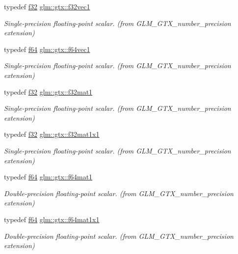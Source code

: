 \begin{DoxyCompactItemize}
typedef \mbox{\hyperlink{group__gtc__type__precision_ga0ec999b57f5330d9021256e96038df04}{f32}} \mbox{\hyperlink{group__gtx__number__precision_gadab8e598b0b4697629482682bdb7f223}{glm\+::gtx\+::f32vec1}}
\begin{DoxyCompactList}\small\item\em Single-\/precision floating-\/point scalar. (from G\+L\+M\+\_\+\+G\+T\+X\+\_\+number\+\_\+precision extension) \end{DoxyCompactList}\item 
typedef \mbox{\hyperlink{group__gtc__type__precision_ga2bba392e555124b36cde6abba349bab3}{f64}} \mbox{\hyperlink{group__gtx__number__precision_ga44336a26c958d66efdfb5a6c114c538e}{glm\+::gtx\+::f64vec1}}
\begin{DoxyCompactList}\small\item\em Single-\/precision floating-\/point scalar. (from G\+L\+M\+\_\+\+G\+T\+X\+\_\+number\+\_\+precision extension) \end{DoxyCompactList}\item 
typedef \mbox{\hyperlink{group__gtc__type__precision_ga0ec999b57f5330d9021256e96038df04}{f32}} \mbox{\hyperlink{group__gtx__number__precision_gae5ff376ec910c360f06acc0c2b99260c}{glm\+::gtx\+::f32mat1}}
\begin{DoxyCompactList}\small\item\em Single-\/precision floating-\/point scalar. (from G\+L\+M\+\_\+\+G\+T\+X\+\_\+number\+\_\+precision extension) \end{DoxyCompactList}\item 
typedef \mbox{\hyperlink{group__gtc__type__precision_ga0ec999b57f5330d9021256e96038df04}{f32}} \mbox{\hyperlink{group__gtx__number__precision_ga01caec78388a82a9a22bd45e5751a38a}{glm\+::gtx\+::f32mat1x1}}
\begin{DoxyCompactList}\small\item\em Single-\/precision floating-\/point scalar. (from G\+L\+M\+\_\+\+G\+T\+X\+\_\+number\+\_\+precision extension) \end{DoxyCompactList}\item 
typedef \mbox{\hyperlink{group__gtc__type__precision_ga2bba392e555124b36cde6abba349bab3}{f64}} \mbox{\hyperlink{group__gtx__number__precision_ga23f8f53c78b50aa07a113c3d07d01bc9}{glm\+::gtx\+::f64mat1}}
\begin{DoxyCompactList}\small\item\em Double-\/precision floating-\/point scalar. (from G\+L\+M\+\_\+\+G\+T\+X\+\_\+number\+\_\+precision extension) \end{DoxyCompactList}\item 
typedef \mbox{\hyperlink{group__gtc__type__precision_ga2bba392e555124b36cde6abba349bab3}{f64}} \mbox{\hyperlink{group__gtx__number__precision_ga710a5952d78b22635c71c5fc2c0a3319}{glm\+::gtx\+::f64mat1x1}}
\begin{DoxyCompactList}\small\item\em Double-\/precision floating-\/point scalar. (from G\+L\+M\+\_\+\+G\+T\+X\+\_\+number\+\_\+precision extension) \end{DoxyCompactList}\end{DoxyCompactItemize}


